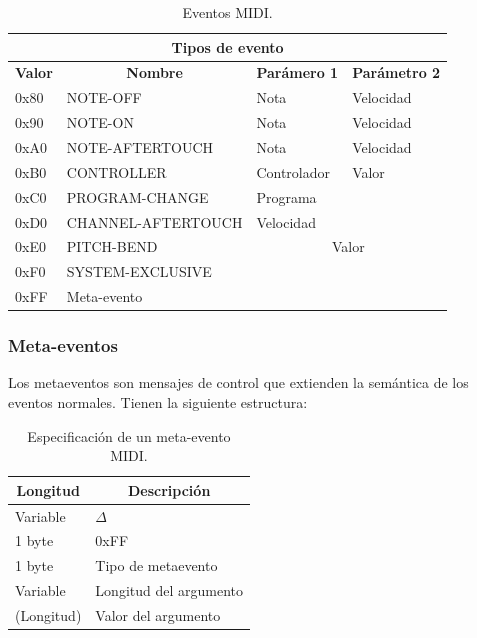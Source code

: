 \begin{table}[H]
	\begin{center}
		\begin{tabular}{|l|l|l|l|}
			\hline \multicolumn{4}{|c|}{\textbf{Tipos de evento}} \\
			\hline \multicolumn{1}{|c|}{\textbf{Valor}} & \multicolumn{1}{c|}{\textbf{Nombre}} & \multicolumn{1}{c|}{\textbf{Parámero 1}} & \multicolumn{1}{c|}{\textbf{Parámetro 2}} \\
			\hline 0x80 & NOTE-OFF & Nota & Velocidad \\
			\hline 0x90 & NOTE-ON & Nota & Velocidad \\
			\hline 0xA0 & NOTE-AFTERTOUCH & Nota & Velocidad \\
			\hline 0xB0 & CONTROLLER & Controlador & Valor \\
			\hline 0xC0 & PROGRAM-CHANGE & Programa &  \\
			\hline 0xD0 & CHANNEL-AFTERTOUCH & Velocidad &  \\
			\hline 0xE0 & PITCH-BEND & \multicolumn{2}{c|}{Valor} \\
			\hline 0xF0 & SYSTEM-EXCLUSIVE & \multicolumn{2}{c|}{} \\
			\hline 0xFF & Meta-evento & \multicolumn{2}{c|}{} \\
			\hline 
		\end{tabular}
		\smallskip
		\caption{\label{tab:midi_eventos} Eventos MIDI.}
	\end{center}
\end{table}

\smallskip

\subsubsection{Meta-eventos}

Los metaeventos son mensajes de control que extienden la semántica de los eventos normales. Tienen la siguiente estructura:

\smallskip

\begin{table}[H]
	\begin{center}
		\begin{tabular}{|l|l|}
			\hline \multicolumn{1}{|c|}{\textbf{Longitud}} & \multicolumn{1}{c|}{\textbf{Descripción}} \\
			\hline Variable & $\Delta$ \\ 
			\hline 1 byte & 0xFF \\
			\hline 1 byte & Tipo de metaevento \\
			\hline Variable & Longitud del argumento \\ 
			\hline (Longitud) & Valor del argumento \\ 
			\hline
		\end{tabular}
		\smallskip
		\caption{\label{tab:midi_mevaevento} Especificación de un meta-evento MIDI.}
	\end{center}
\end{table}

